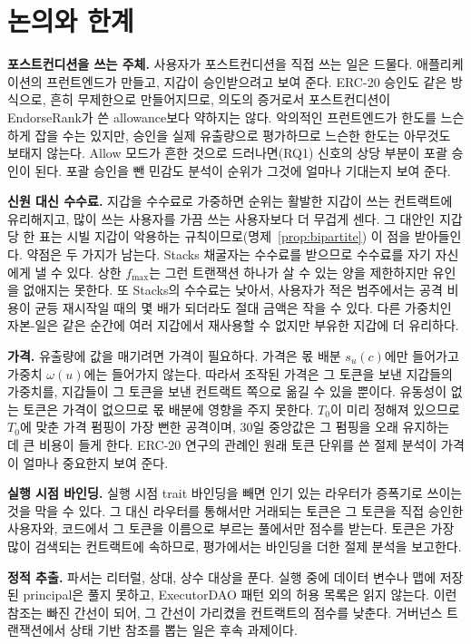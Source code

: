 \section{논의와 한계}
\label{sec:discussion}

\textbf{포스트컨디션을 쓰는 주체.} 사용자가 포스트컨디션을 직접 쓰는 일은 드물다. 애플리케이션의 프런트엔드가 만들고, 지갑이 승인받으려고 보여 준다. ERC-20 승인도 같은 방식으로, 흔히 무제한으로 만들어지므로, 의도의 증거로서 포스트컨디션이 EndorseRank가 쓴 allowance보다 약하지는 않다. 악의적인 프런트엔드가 한도를 느슨하게 잡을 수는 있지만,  승인을 실제 유출량으로 평가하므로 느슨한 한도는 아무것도 보태지 않는다. Allow 모드가 흔한 것으로 드러나면(RQ1) 신호의 상당 부분이 포괄 승인이 된다. 포괄 승인을 뺀 민감도 분석이 순위가 그것에 얼마나 기대는지 보여 준다.

\textbf{신원 대신 수수료.} 지갑을 수수료로 가중하면 순위는 활발한 지갑이 쓰는 컨트랙트에 유리해지고, 많이 쓰는 사용자를 가끔 쓰는 사용자보다 더 무겁게 센다. 그 대안인 지갑당 한 표는 시빌 지갑이 악용하는 규칙이므로(명제~\ref{prop:bipartite}) 이 점을 받아들인다. 약점은 두 가지가 남는다. Stacks 채굴자는 수수료를 받으므로 수수료를 자기 자신에게 낼 수 있다. 상한 $f_{\max}$는 그런 트랜잭션 하나가 살 수 있는 양을 제한하지만 유인을 없애지는 못한다. 또 Stacks의 수수료는 낮아서, 사용자가 적은 범주에서는 공격 비용이 균등 재시작일 때의 몇 배가 되더라도 절대 금액은 작을 수 있다. 다른 가중치인 자본-일은 같은 순간에 여러 지갑에서 재사용할 수 없지만 부유한 지갑에 더 유리하다.

\textbf{가격.} 유출량에 값을 매기려면 가격이 필요하다. 가격은 몫 배분 $s_u(c)$에만 들어가고 가중치 $\omega(u)$에는 들어가지 않는다. 따라서 조작된 가격은 그 토큰을 보낸 지갑들의 가중치를, 지갑들이 그 토큰을 보낸 컨트랙트 쪽으로 옮길 수 있을 뿐이다. 유동성이 없는 토큰은 가격이 없으므로 몫 배분에 영향을 주지 못한다. $T_0$이 미리 정해져 있으므로 $T_0$에 맞춘 가격 펌핑이 가장 뻔한 공격이며, 30일 중앙값은 그 펌핑을 오래 유지하는 데 큰 비용이 들게 한다. ERC-20 연구의 관례인 원래 토큰 단위를 쓴 절제 분석이 가격이 얼마나 중요한지 보여 준다.

\textbf{실행 시점 바인딩.} 실행 시점 trait 바인딩을 빼면 인기 있는 라우터가 증폭기로 쓰이는 것을 막을 수 있다. 그 대신 라우터를 통해서만 거래되는 토큰은 그 토큰을 직접 승인한 사용자와, 코드에서 그 토큰을 이름으로 부르는 풀에서만 점수를 받는다. 토큰은 가장 많이 검색되는 컨트랙트에 속하므로, 평가에서는 바인딩을 더한 절제 분석을 보고한다.

\textbf{정적 추출.} 파서는 리터럴, 상대, 상수 대상을 푼다. 실행 중에 데이터 변수나 맵에 저장된 principal은 풀지 못하고, ExecutorDAO 패턴 외의 허용 목록은 읽지 않는다. 이런 참조는 빠진 간선이 되어, 그 간선이 가리켰을 컨트랙트의 점수를 낮춘다. 거버넌스 트랜잭션에서 상태 기반 참조를 뽑는 일은 후속 과제이다.


